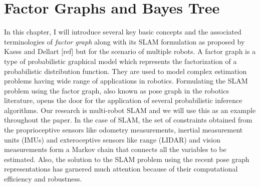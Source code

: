 \chapter{Factor Graphs and Bayes Tree}

In this chapter, I will introduce several key basic concepts and the associated terminologies of \textit{factor graph} \cite{factorgraph} along with its SLAM formulation as proposed by Kaess and Dellart [ref] but for the scenario of multiple robots. A factor graph is a type of probabilistic graphical model which represents the factorization of a probabilistic distribution function. They are used to model complex estimation problems having wide range of applications in robotics. Formulating the SLAM problem using the factor graph, also known as pose graph in the robotics literature, opens the door for the application of several probabilistic inference algorithms. Our research is multi-robot SLAM and we will use this as an example throughout the paper. In the case of SLAM, the set of constraints obtained from the proprioceptive sensors like odometry measurements, inertial measurement units (IMUs) and exteroceptive sensors like range (LIDAR) and vision measurements form a Markov chain that connects all the variables to be estimated. Also, the solution to the SLAM problem using the recent pose graph representations has garnered much attention because of their computational efficiency and robustness. 






